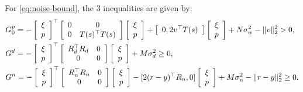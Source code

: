 \documentclass[11pt, onecolumn]{article}
\begin{document}
For \eqref{eq:noise-bound}, the 3 inequalities are given by:
\begin{align*}
&  G^p_0 =   - \left[ \begin{array}[c]{c} \xi\\ p \end{array} \right]^\top
  \left[ \begin{array}[c]{cc} 0  &0 \\ 0 & T(s)^\top T(s)   \end{array} \right]
  \left[ \begin{array}[c]{c} \xi \\p \end{array} \right]
  +  \left[ \begin{array}[c]{c c} 0, 2v^\top T(s) \end{array} \right]
  \left[ \begin{array}[c]{c} \xi  \\p \end{array} \right] + N\sigma_w^2 - \|v\|_2^2 > 0,
  \\
&  G^d = - \left[ \begin{array}[c]{c} \xi\\ p \end{array} \right]^\top
  \left[ \begin{array}[c]{cc} R_d^\top R_d  &0 \\ 0 & 0  \end{array} \right]
  \left[ \begin{array}[c]{c} \xi \\p \end{array} \right] +  M\sigma_d^2 \ge 0,
  \\
&  G^n =  - \left[ \begin{array}[c]{c} \xi\\ p \end{array} \right]^\top
  \left[ \begin{array}[c]{cc} R_n^\top R_n  & 0 \\ 0 & 0  \end{array} \right]
  \left[ \begin{array}[c]{c} \xi \\p \end{array} \right] -
  [ 2(r-y)^\top R_n, 0]    \left[ \begin{array}[c]{c} \xi  \\p \end{array} \right] + M\sigma_n^2  -
  \|r-y\|_2^2 \ge 0.
\end{align*}
\end{document}
